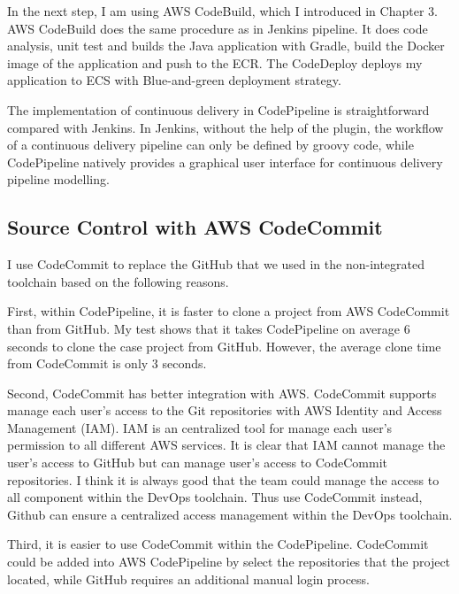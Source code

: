 \par
In the next step, I am using AWS CodeBuild, which I introduced in Chapter 3. AWS CodeBuild does the same procedure as in Jenkins pipeline. It does code analysis, unit test and builds the Java application with Gradle, build the Docker image of the application and push to the ECR. The CodeDeploy deploys my application to ECS with Blue-and-green deployment strategy.
\par
The implementation of continuous delivery in CodePipeline is straightforward compared with Jenkins. In Jenkins, without the help of the plugin, the workflow of a continuous delivery pipeline can only be defined by groovy code, while CodePipeline natively provides a graphical user interface for continuous delivery pipeline modelling. 
\subsection{Source Control with AWS CodeCommit}
I use CodeCommit to replace the GitHub that we used in the non-integrated toolchain based on the following reasons.
\par
First, within CodePipeline, it is faster to clone a project from AWS CodeCommit than from GitHub. My test shows that it takes CodePipeline on average 6 seconds to clone the case project from GitHub. However, the average clone time from CodeCommit is only 3 seconds.
\par
Second, CodeCommit has better integration with AWS. CodeCommit supports manage each user's access to the Git repositories with AWS Identity and Access Management (IAM). IAM is an centralized tool for manage each user's permission to all different AWS services. It is clear that IAM cannot manage the user's access to GitHub but can manage user's access to CodeCommit repositories. I think it is always good that the team could manage the access to all component within the DevOps toolchain. Thus use CodeCommit instead, Github can ensure a centralized access management within the DevOps toolchain.
\par
Third, it is easier to use CodeCommit within the CodePipeline. CodeCommit could be added into AWS CodePipeline by select the repositories that the project located, while GitHub requires an additional manual login process.
